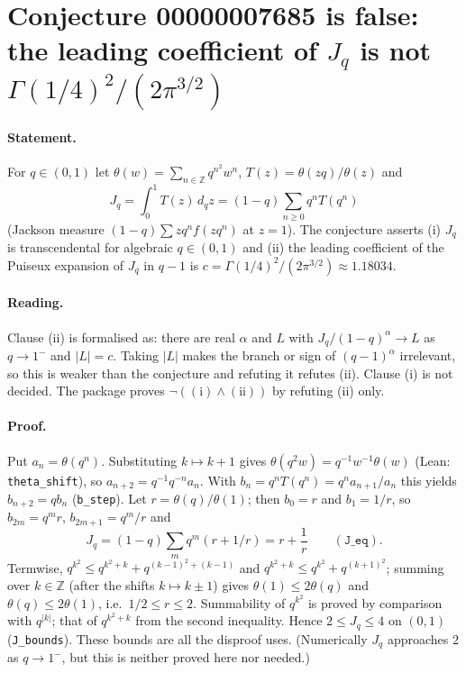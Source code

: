 \documentclass[11pt]{article}
\begin{document}
\section*{Conjecture 00000007685 is false: the leading coefficient of $J_q$ is not $\Gamma(1/4)^2/(2\pi^{3/2})$}

\paragraph{Statement.} For $q\in(0,1)$ let $\theta(w)=\sum_{n\in\mathbb Z}q^{n^2}w^n$, $T(z)=\theta(zq)/\theta(z)$ and
\[
J_q=\int_0^1 T(z)\,d_qz=(1-q)\sum_{n\ge0}q^nT(q^n)
\]
(Jackson measure $(1-q)\sum z q^n f(zq^n)$ at $z=1$). The conjecture asserts (i) $J_q$ is transcendental for algebraic $q\in(0,1)$ and (ii) the leading coefficient of the Puiseux expansion of $J_q$ in $q-1$ is $c=\Gamma(1/4)^2/(2\pi^{3/2})\approx1.18034$.

\paragraph{Reading.} Clause (ii) is formalised as: there are real $\alpha$ and $L$ with $J_q/(1-q)^\alpha\to L$ as $q\to1^-$ and $|L|=c$. Taking $|L|$ makes the branch or sign of $(q-1)^\alpha$ irrelevant, so this is weaker than the conjecture and refuting it refutes (ii). Clause (i) is not decided. The package proves $\neg((\mathrm i)\wedge(\mathrm{ii}))$ by refuting (ii) only.

\paragraph{Proof.} Put $a_n=\theta(q^n)$. Substituting $k\mapsto k+1$ gives $\theta(q^2w)=q^{-1}w^{-1}\theta(w)$ (Lean: \texttt{theta\_shift}), so $a_{n+2}=q^{-1}q^{-n}a_n$. With $b_n=q^nT(q^n)=q^na_{n+1}/a_n$ this yields $b_{n+2}=qb_n$ (\texttt{b\_step}). Let $r=\theta(q)/\theta(1)$; then $b_0=r$ and $b_1=1/r$, so $b_{2m}=q^mr$, $b_{2m+1}=q^m/r$ and
\[
J_q=(1-q)\sum_m q^m(r+1/r)=r+\frac1r\qquad(\texttt{J\_eq}).
\]
Termwise, $q^{k^2}\le q^{k^2+k}+q^{(k-1)^2+(k-1)}$ and $q^{k^2+k}\le q^{k^2}+q^{(k+1)^2}$; summing over $k\in\mathbb Z$ (after the shifts $k\mapsto k\pm1$) gives $\theta(1)\le2\theta(q)$ and $\theta(q)\le2\theta(1)$, i.e.\ $1/2\le r\le2$. Summability of $q^{k^2}$ is proved by comparison with $q^{|k|}$; that of $q^{k^2+k}$ from the second inequality. Hence $2\le J_q\le4$ on $(0,1)$ (\texttt{J\_bounds}). These bounds are all the disproof uses. (Numerically $J_q$ approaches $2$ as $q\to1^-$, but this is neither proved here nor needed.)
\end{document}
